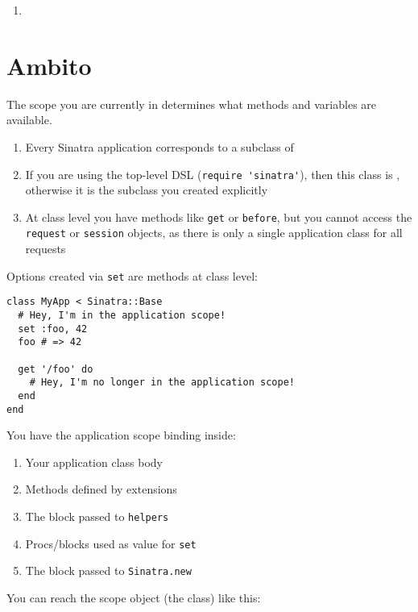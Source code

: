 \begin{enumerate}
\item 
{}
\end{enumerate}

\section{Ambito}
The scope you are currently in determines what methods and variables are available.


\begin{enumerate}
\item 
Every Sinatra application corresponds to a subclass of 
\item  If you are using the top-level DSL (\verb|require 'sinatra'|), then this class is , otherwise it is the subclass you created explicitly
\item  At class level you have methods like \verb|get| or \verb|before|, 
but you cannot access the \verb|request| or \verb|session| objects, 
as there is only a single application class for all requests
\end{enumerate}

Options created via \verb|set| are methods at class level:

\begin{verbatim}
class MyApp < Sinatra::Base
  # Hey, I'm in the application scope!
  set :foo, 42
  foo # => 42

  get '/foo' do
    # Hey, I'm no longer in the application scope!
  end
end
\end{verbatim}

You have the application scope binding inside:

\begin{enumerate}
\item 
Your application class body
\item 
Methods defined by extensions
\item 
The block passed to \verb|helpers|
\item 
Procs/blocks used as value for \verb|set|
\item 
The block passed to \verb|Sinatra.new|
\end{enumerate}

You can reach the scope object (the class) like this:

